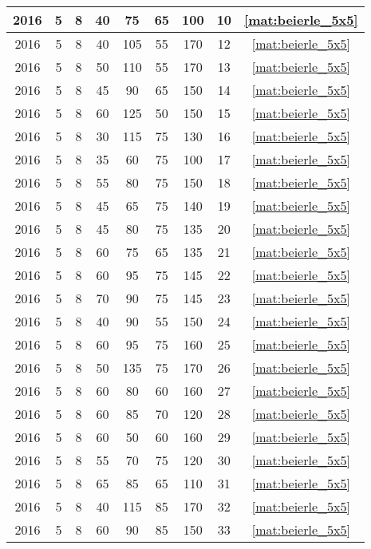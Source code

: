 \begin{longtable}{|c|c|c|c|c|c|c|c|c|}
2016 & 5 & 8 & 40 & 75 & 65 & 100 & 10 & \eqref{mat:beierle_5x5} \\ \hline 
2016 & 5 & 8 & 40 & 105 & 55 & 170 & 12 & \eqref{mat:beierle_5x5} \\ \hline 
2016 & 5 & 8 & 50 & 110 & 55 & 170 & 13 & \eqref{mat:beierle_5x5} \\ \hline 
2016 & 5 & 8 & 45 & 90 & 65 & 150 & 14 & \eqref{mat:beierle_5x5} \\ \hline 
2016 & 5 & 8 & 60 & 125 & 50 & 150 & 15 & \eqref{mat:beierle_5x5} \\ \hline 
2016 & 5 & 8 & 30 & 115 & 75 & 130 & 16 & \eqref{mat:beierle_5x5} \\ \hline 
2016 & 5 & 8 & 35 & 60 & 75 & 100 & 17 & \eqref{mat:beierle_5x5} \\ \hline 
2016 & 5 & 8 & 55 & 80 & 75 & 150 & 18 & \eqref{mat:beierle_5x5} \\ \hline 
2016 & 5 & 8 & 45 & 65 & 75 & 140 & 19 & \eqref{mat:beierle_5x5} \\ \hline 
2016 & 5 & 8 & 45 & 80 & 75 & 135 & 20 & \eqref{mat:beierle_5x5} \\ \hline 
2016 & 5 & 8 & 60 & 75 & 65 & 135 & 21 & \eqref{mat:beierle_5x5} \\ \hline 
2016 & 5 & 8 & 60 & 95 & 75 & 145 & 22 & \eqref{mat:beierle_5x5} \\ \hline 
2016 & 5 & 8 & 70 & 90 & 75 & 145 & 23 & \eqref{mat:beierle_5x5} \\ \hline 
2016 & 5 & 8 & 40 & 90 & 55 & 150 & 24 & \eqref{mat:beierle_5x5} \\ \hline 
2016 & 5 & 8 & 60 & 95 & 75 & 160 & 25 & \eqref{mat:beierle_5x5} \\ \hline 
2016 & 5 & 8 & 50 & 135 & 75 & 170 & 26 & \eqref{mat:beierle_5x5} \\ \hline 
2016 & 5 & 8 & 60 & 80 & 60 & 160 & 27 & \eqref{mat:beierle_5x5} \\ \hline 
2016 & 5 & 8 & 60 & 85 & 70 & 120 & 28 & \eqref{mat:beierle_5x5} \\ \hline 
2016 & 5 & 8 & 60 & 50 & 60 & 160 & 29 & \eqref{mat:beierle_5x5} \\ \hline 
2016 & 5 & 8 & 55 & 70 & 75 & 120 & 30 & \eqref{mat:beierle_5x5} \\ \hline 
2016 & 5 & 8 & 65 & 85 & 65 & 110 & 31 & \eqref{mat:beierle_5x5} \\ \hline 
2016 & 5 & 8 & 40 & 115 & 85 & 170 & 32 & \eqref{mat:beierle_5x5} \\ \hline 
2016 & 5 & 8 & 60 & 90 & 85 & 150 & 33 & \eqref{mat:beierle_5x5} \\ \hline 

\end{longtable}
